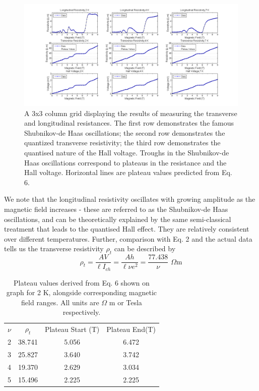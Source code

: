 \documentclass[aps,prl,nofootinbib,twocolumn,superscriptaddress,groupedaddress]{revtex4}  %
\begin{document}
\onecolumngrid

\begin{figure}[b]
\centering
\includegraphics[width = \textwidth]{../Analysis/ChannelsVField.png}
\caption{A 3x3 column grid displaying the results of measuring the transverse and longitudinal resistances. The first row demonstrates the famous Shubnikov-de Haas oscillations; the second row demonstrates the quantized  transverse resistivity; the third row demonstrates the quantised nature of the Hall voltage. Troughs in the Shubnikov-de Haas oscillations correspond to plateaus in the resistance and the Hall voltage. Horizontal lines are plateau values predicted from Eq. 6.}
\end{figure}

\twocolumngrid

We note that the longitudinal resistivity oscillates with growing amplitude as the magnetic field increases - these are referred to as the Shubnikov-de Haas oscillations, and can be theoretically explained by the same semi-classical treatment that leads to the quantised Hall effect\cite{lab}. They are relatively consistent over different temperatures. Further, comparison with Eq. 2 and the actual data tells us the transverse resistivity $\rho_{t}$ can be described by \begin{equation}
\rho_{t} = \frac{AV}{\ell I_{ch}} = \frac{Ah}{\ell\nu e^{2}} = \frac{77.438}{\nu} \,\,\Omega \mathrm{m}
\end{equation} 
\begin{table}[t]
\caption{Plateau values derived from Eq. 6 shown on graph for 2 K, alongside corresponding magnetic field ranges. All units are $\Omega$ m or Tesla respectively.}
\begin{ruledtabular}
\begin{tabular}{cccc}
$\nu$ & $\rho_{t}$& Plateau Start (T) & Plateau End(T)\\
2 & 38.741& 5.056 & 6.472 \\
3 & 25.827& 3.640 & 3.742 \\
4 & 19.370 & 2.629 & 3.034 \\
5 & 15.496 & 2.225 & 2.225 \\
\end{tabular}
\end{ruledtabular}
\end{table}
\end{document}
